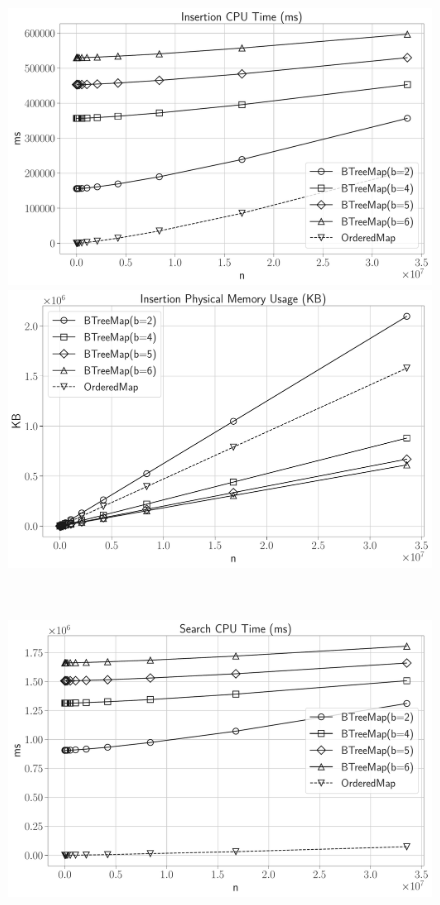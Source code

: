 \documentclass[12pt]{article}
\begin{document}
\begin{figure}[H]
	\centering
	\begin{minipage}{0.5\textwidth}
		\centering
		\includegraphics[width=1\linewidth]{../notebook/plot/insertion_cpu_time_(ms)}
	\end{minipage}\hfill
	\begin{minipage}{0.5\textwidth}
		\centering
		\includegraphics[width=1\linewidth]{../notebook/plot/insertion_physical_memory_usage_(kb)}
	\end{minipage}\hfill 
	\\
	\begin{minipage}{0.5\textwidth}
		\centering
		\includegraphics[width=1\linewidth]{../notebook/plot/search_cpu_time_(ms)}
	\end{minipage}\hfill


\end{figure}
\end{document}
